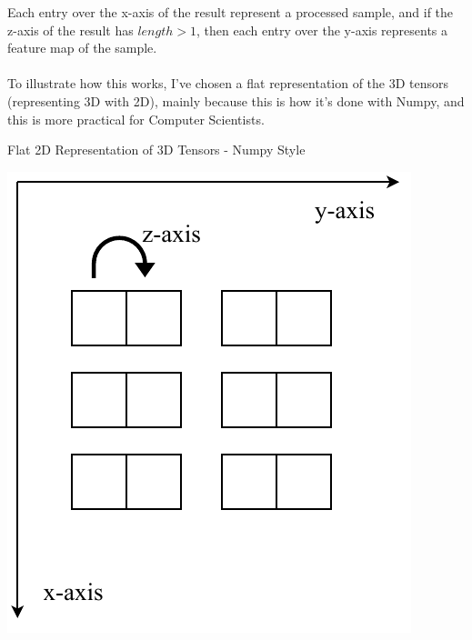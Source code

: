 \documentclass[a4paper, 12pt]{report}
\begin{document}
Each entry over the x-axis of the result represent a processed sample, and if the z-axis of the result has $ length > 1 $, then each entry over the y-axis represents a feature map of the sample.\\\\
To illustrate how this works, I've chosen a flat representation of the 3D tensors (representing 3D with 2D), mainly because this is how it's done with Numpy, and this is more practical for Computer Scientists.
\begin{blockfigure}{Flat 2D Representation of 3D Tensors - Numpy Style}
		\begin{center}
			\includegraphics[height=0.21\textheight]{numpy-3Dtensor-axis}
		\end{center}
\end{blockfigure}
\newpage
\end{document}
